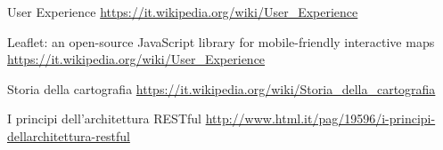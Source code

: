 \begin{thebibliography}{99}
User Experience
\url{https://it.wikipedia.org/wiki/User_Experience}

Leaflet: an open-source JavaScript library for mobile-friendly interactive maps
\url{https://it.wikipedia.org/wiki/User_Experience}

Storia della cartografia
\url{https://it.wikipedia.org/wiki/Storia_della_cartografia}

I principi dell’architettura RESTful
\url{http://www.html.it/pag/19596/i-principi-dellarchitettura-restful} 




\end{thebibliography}




